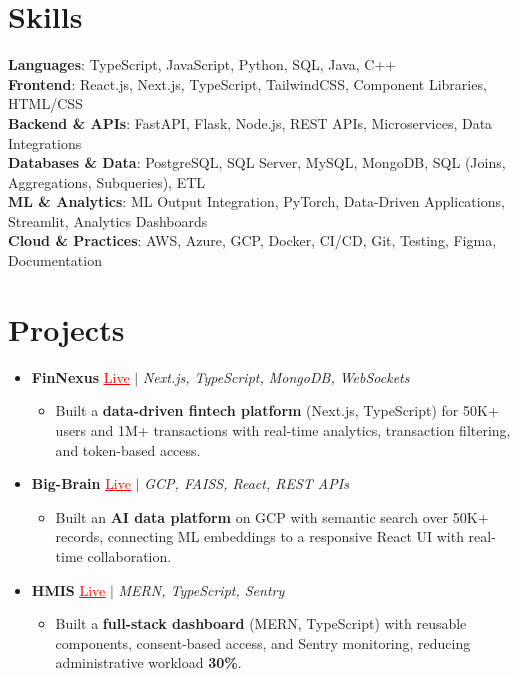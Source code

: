 \documentclass[letterpaper,10pt]{article}
\newcommand{\resumeItem}[1]{\item\small{{#1 \vspace{-2pt}}}}
\newcommand{\resumeProjectHeading}[1]{\item \small #1 \vspace{-2pt}}
\newcommand{\resumeSubHeadingListStart}{\begin{itemize}[leftmargin=0.0in, label={}]}
\newcommand{\resumeSubHeadingListEnd}{\end{itemize}}
\newcommand{\resumeProjItemListStart}{\begin{itemize}[leftmargin=0.15in,label=\textbullet,itemsep=0pt,topsep=0pt,parsep=0pt,partopsep=0pt]}
\newcommand{\resumeProjItemListEnd}{\end{itemize}\vspace{-4pt}}
\begin{document}
\section{Skills}
\begin{itemize}[leftmargin=0.15in, label={}]
\small{\item{
\textbf{Languages}: TypeScript, JavaScript, Python, SQL, Java, C++ \\
\textbf{Frontend}: React.js, Next.js, TypeScript, TailwindCSS, Component Libraries, HTML/CSS \\
\textbf{Backend \& APIs}: FastAPI, Flask, Node.js, REST APIs, Microservices, Data Integrations \\
\textbf{Databases \& Data}: PostgreSQL, SQL Server, MySQL, MongoDB, SQL (Joins, Aggregations, Subqueries), ETL \\
\textbf{ML \& Analytics}: ML Output Integration, PyTorch, Data-Driven Applications, Streamlit, Analytics Dashboards \\
\textbf{Cloud \& Practices}: AWS, Azure, GCP, Docker, CI/CD, Git, Testing, Figma, Documentation
}}
\end{itemize}
\vspace{-6pt}
\section{Projects}
\resumeSubHeadingListStart
\vspace{-2pt}
\resumeProjectHeading{\textbf{FinNexus} {\href{https://fin-nexus.vercel.app/}{\textcolor{red}{\underline{Live}}}} $|$ \emph{Next.js, TypeScript, MongoDB, WebSockets}}
\resumeProjItemListStart
\resumeItem{Built a \textbf{data-driven fintech platform} (Next.js, TypeScript) for 50K+ users and 1M+ transactions with real-time analytics, transaction filtering, and token-based access.}
\resumeProjItemListEnd
\vspace{3pt}
\resumeProjectHeading{\textbf{Big-Brain} {\href{https://big-brain-pied.vercel.app/}{\textcolor{red}{\underline{Live}}}} $|$ \emph{GCP, FAISS, React, REST APIs}}
\resumeProjItemListStart
\resumeItem{Built an \textbf{AI data platform} on GCP with semantic search over 50K+ records, connecting ML embeddings to a responsive React UI with real-time collaboration.}
\resumeProjItemListEnd
\vspace{3pt}
\resumeProjectHeading{\textbf{HMIS} {\href{https://hims-rouge.vercel.app/}{\textcolor{red}{\underline{Live}}}} $|$ \emph{MERN, TypeScript, Sentry}}
\resumeProjItemListStart
\resumeItem{Built a \textbf{full-stack dashboard} (MERN, TypeScript) with reusable components, consent-based access, and Sentry monitoring, reducing administrative workload \textbf{30\%}.}
\resumeProjItemListEnd
\resumeSubHeadingListEnd
\end{document}
